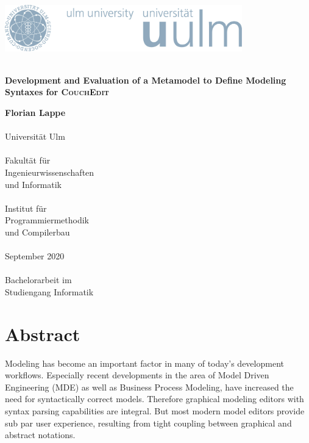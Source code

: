 \documentclass[
a4paper,
headsepline,           %
numbers=noenddot,      %
bibliography=totoc,              %
BCOR=15mm,               %
leqno,					%
]{scrbook}
\newcommand{\fullname}{Florian Lappe}
\newcommand{\titel}{}
\newcommand{\untertitel}{Development and Evaluation of a Metamodel to Define Modeling Syntaxes for \textsc{CouchEdit}}
\newcommand{\abgabedatum}{September 2020}
\newcommand{\abschlussarbeit}{Bachelorarbeit}
\begin{document}
\frontmatter %


\begin{titlepage}
  \selectfont %
  \hfill\includegraphics[height=2.0cm]{images/logo_100_sRGB}\\[3.5cm] %
  \begin{flushright}
    \Huge \textbf{\titel}\\[0.2cm]
    \fontsize{19}{20}\selectfont \textbf{\untertitel}\\
  \end{flushright}

  \vfill\hfill
  \parbox[t]{4.6cm}{
  \singlespacing
  \large
  \textbf{\fullname}\\
  \\
  Universität Ulm\\
  \\
  Fakultät für\\
  Ingenieurwissenschaften\\
  und Informatik\\
  \\
  Institut für\\
  Programmiermethodik\\
  und Compilerbau\\
  \\
  \abgabedatum\\
  \\
  {\abschlussarbeit} im\\
  Studiengang Informatik
  }
\end{titlepage}
\restoregeometry


\clearpage
\thispagestyle{empty}
\chapter*{Abstract}


Modeling has become an important factor in many of today's development workflows. Especially recent developments in the area of Model Driven Engineering (MDE) as well as Business Process Modeling, have increased the need for syntactically correct models. Therefore graphical modeling editors with syntax parsing capabilities are integral. But most modern model editors provide sub par user experience, resulting from tight coupling between graphical and abstract notations. 
\end{document}

